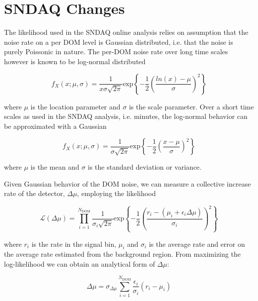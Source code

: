 \section{SNDAQ Changes}

The likelihood used in the SNDAQ online analysis relies on assumption that the noise rate on a per DOM level is Gaussian distributed, i.e. that the noise is purely Poissonic in nature. The per-DOM noise rate over long time scales however is known to be log-normal distributed

\begin{equation}
    f_{X}(x; \mu, \sigma) = \frac{1}{x \sigma \sqrt{2\pi}} \textrm{exp} \left\{ -\frac{1}{2} \left( \frac{ln(x) - \mu}{\sigma}  \right)^{2} \right\}
\end{equation}

\noindent where $\mu$ is the location parameter and $\sigma$ is the scale parameter. Over a short time scales as used in the SNDAQ analysis, i.e. \unit[11]{minutes}, the log-normal behavior can be approximated with a Gaussian 

\begin{equation}
    f_{X}(x; \mu, \sigma) = \frac{1}{\sigma \sqrt{2\pi}} \textrm{exp} \left\{ -\frac{1}{2} \left( \frac{x - \mu}{\sigma}  \right)^{2} \right\}
\end{equation}

\noindent where $\mu$ is the mean and $\sigma$ is the standard deviation or variance. 

Given Gaussian behavior of the DOM noise, we can measure a collective increase rate of the detector, $\Delta \mu$, employing the likelihood

\begin{equation}
    \mathcal{L}(\Delta \mu) = \prod_{i=1}^{N_{\textrm{DOM}}} \frac{1}{\sigma_{i} \sqrt{2\pi}} \textrm{exp} \left\{ -\frac{1}{2} \left( \frac{r_{i} - (\mu_{i } + \epsilon_{i}\Delta \mu)}{\sigma_{i}}  \right)^{2} \right\}
\end{equation}

\noindent where $r_{i}$ is the rate in the signal bin, $\mu_{i}$ and $\sigma_{i}$ is the average rate and error on the average rate estimated from the background region. From maximizing the log-likelihood we can obtain an analytical form of $\Delta \mu$:

\begin{equation}
  \Delta \mu = \sigma_{\Delta \mu} \sum_{i = 1}^{N_{\textrm{DOM}}} \frac{\epsilon_{i}}{\sigma_{i}} (r_{i} - \mu_{i})
\end{equation}

